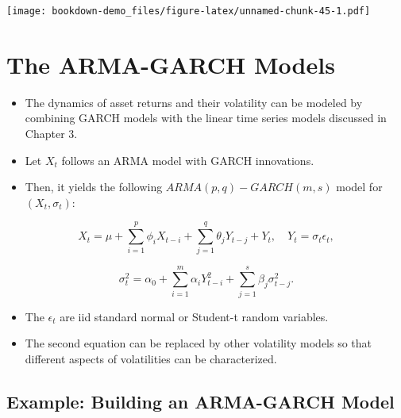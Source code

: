 \documentclass[]{book}
\newenvironment{Shaded}{\begin{snugshade}}{\end{snugshade}}
\newcommand{\CommentTok}[1]{\textcolor[rgb]{0.56,0.35,0.01}{\textit{#1}}}
\newcommand{\DataTypeTok}[1]{\textcolor[rgb]{0.13,0.29,0.53}{#1}}
\newcommand{\DecValTok}[1]{\textcolor[rgb]{0.00,0.00,0.81}{#1}}
\newcommand{\KeywordTok}[1]{\textcolor[rgb]{0.13,0.29,0.53}{\textbf{#1}}}
\newcommand{\NormalTok}[1]{#1}
\newcommand{\OtherTok}[1]{\textcolor[rgb]{0.56,0.35,0.01}{#1}}
\providecommand{\tightlist}{%
  \setlength{\itemsep}{0pt}\setlength{\parskip}{0pt}}
\begin{document}
\begin{Shaded}
\end{Shaded}

\texttt{[image: bookdown-demo\_files/figure-latex/unnamed-chunk-45-1.pdf]}

\hypertarget{the-arma-garch-models}{%
\section{The ARMA-GARCH Models}\label{the-arma-garch-models}}

\begin{itemize}
\tightlist
\item
  The dynamics of asset returns and their volatility can be modeled by combining GARCH models with the linear time series models discussed in Chapter 3.
\item
  Let \(X_t\) follows an ARMA model with GARCH innovations.
\item
  Then, it yields the following \(ARMA(p,q)-GARCH(m,s)\) model for \((X_t, \sigma_t):\)
\end{itemize}

\[X_t=\mu+\sum_{i=1}^p\phi_iX_{t-i}+\sum_{j=1}^q\theta_jY_{t-j} + Y_t, \quad Y_t=\sigma_t\epsilon_t,\]

\[\sigma^2_t=\alpha_0+
\sum_{i=1}^m\alpha_iY_{t-i}^2+\sum_{j=1}^s\beta_j\sigma_{t-j}^2.\]

\begin{itemize}
\tightlist
\item
  The \(\epsilon_t\) are iid standard normal or Student-t random variables.
\item
  The second equation can be replaced by other volatility models so that different aspects of volatilities can be characterized.
\end{itemize}

\hypertarget{example-building-an-arma-garch-model}{%
\subsection{Example: Building an ARMA-GARCH Model}\label{example-building-an-arma-garch-model}}
\end{document}
